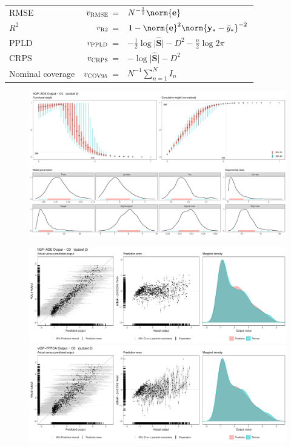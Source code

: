 \documentclass{snedecorbeamer}
\begin{document}
\begin{frame}
  \begin{center}
    \begin{tabular}{lrl}
      RMSE
      & $v_{\textsc{RMSE}}$ =
      & $N^{-\frac{1}{2}} \norm{\mathbf{e}}$ \\
      $R^2$
      & $v_{\textsc{R2}} $ =
      & $1 -%
        \norm{\mathbf{e}}^{2}
        \norm{\mathbf{y}_* - \bar{y}_*}^{-2}$ \\
      PPLD
      & $v_{\textsc{PPLD}}$ =
      & $
        -\frac{1}{2} \log \lvert \hat{\mathbf{S}} \rvert
        -D^2
        -\frac{n}{2} \log 2 \pi
        $
      \\
      CRPS
      & $v_{\textsc{CRPS}}$ =
      & $
        -\log \lvert \hat{\mathbf{S}} \rvert%
        -D^2
        $
      \\
      Nominal coverage
      & $v_{\textsc{COV95}}$ =
      & $N^{-1} \sum_{n = 1}^{N} I_{n}$
    \end{tabular}
  \end{center}
\end{frame}

\begin{frame}[c]
  \begin{figure}
    \centering
    \includegraphics[width=.95\textwidth]{param-band2-unk-2-fiGP-ADE-1-O3.pdf}
  \end{figure}
\end{frame}

\begin{frame}[c]
  \begin{figure}
    \centering
    \includegraphics[width=.75\textwidth]{pred-band2-unk-2-fiGP-ADE-1-O3.pdf}
    \includegraphics[width=.75\textwidth]{pred-band2-unk-2-viGP-FFPCA-1-O3.pdf}
  \end{figure}
\end{frame}
\end{document}

